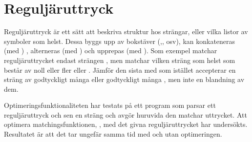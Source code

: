 \documentclass[Rapport]{subfiles}
\begin{document}

\section{Reguljäruttryck}

Reguljäruttryck är ett sätt att beskriva struktur hos strängar, eller vilka
listor av symboler som helst. Dessa byggs upp av bokstäver
(,, osv), 
kan konkateneras (med ) 
, alterneras (med \ic{|})
 och upprepas (med \ic{*}). 
Som exempel matchar reguljäruttrycket  endast strängen ,
men  matchar vilken sträng som helst som består av noll eller fler
 eller . Jämför den sista med  som istället accepterar
en sträng av godtyckligt många  eller godtyckligt många , men inte 
en blandning av dem.

Optimeringsfunktionaliteten har testats på ett program som parsar ett reguljäruttryck
och sen en sträng och avgör huruvida den matchar uttrycket. Att optimera 
matchingsfunktionen, , med det givna
reguljäruttrycket har undersökts. Resultatet är att det tar ungefär samma
tid med och utan optimeringen. 
\end{document}
